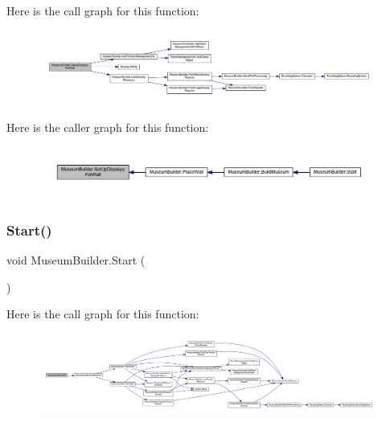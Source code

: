 Here is the call graph for this function\+:
\nopagebreak
\begin{figure}[H]
\begin{center}
\leavevmode
\includegraphics[width=350pt]{class_museum_builder_adbfb12c00a855fe0f816bc18a51a72e5_cgraph}
\end{center}
\end{figure}
Here is the caller graph for this function\+:
\nopagebreak
\begin{figure}[H]
\begin{center}
\leavevmode
\includegraphics[width=350pt]{class_museum_builder_adbfb12c00a855fe0f816bc18a51a72e5_icgraph}
\end{center}
\end{figure}
\mbox{\label{class_museum_builder_a33c69af71baa8a6033be9d2fc04ef5f8}} 
\subsubsection{\texorpdfstring{Start()}{Start()}}
{\footnotesize\ttfamily void Museum\+Builder.\+Start (\begin{DoxyParamCaption}{ }\end{DoxyParamCaption})\hspace{0.3cm}{\ttfamily [private]}}

Here is the call graph for this function\+:
\nopagebreak
\begin{figure}[H]
\begin{center}
\leavevmode
\includegraphics[width=350pt]{class_museum_builder_a33c69af71baa8a6033be9d2fc04ef5f8_cgraph}
\end{center}
\end{figure}
\mbox{\label{class_museum_builder_a3e3b2909202167c6b1e5515317b3cb1e}} 
